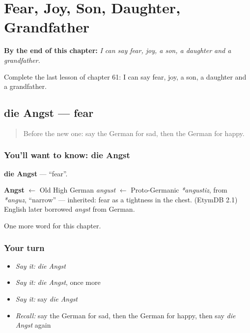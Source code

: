 
\chapter{Fear, Joy, Son, Daughter, Grandfather}
\label{ch:ge-fear-joy-son-daughter-grandfather}

\begin{chapteropening}
\textbf{By the end of this chapter:} \emph{I can say fear, joy, a son, a daughter and a grandfather.}

Complete the last lesson of chapter 61: I can say fear, joy, a son, a daughter and a grandfather.
\end{chapteropening}

\section[die Angst]{die Angst — fear}

\label{lesson:GE-C61-angst}



\begin{quote}
Before the new one: say the German for sad, then the German for happy.
\end{quote}

\subsection*{You'll want to know: die Angst}
\textbf{die Angst} — \textquotedblleft{}fear\textquotedblright{}.

\begin{cousinweb}
\textbf{Angst} $\leftarrow$ Old High German \emph{angust} $\leftarrow$ Proto-Germanic \emph{*angustiz}, from \emph{*anguz}, \textquotedblleft{}narrow\textquotedblright{} — inherited: fear as a tightness in the chest. (EtymDB 2.1) English later borrowed \emph{angst} from German.
\end{cousinweb}

\begin{grammarlens}[title={What you've built}]
One more word for this chapter.
\end{grammarlens}

\subsection*{Your turn}
\begin{itemize}
\raggedright
  \item \emph{Say it:} \emph{die Angst}
  \item \emph{Say it:} \emph{die Angst}, once more
  \item \emph{Say it:} say \emph{die Angst}
  \item \emph{Recall:} say the German for sad, then the German for happy, then say \emph{die Angst} again
\end{itemize}

